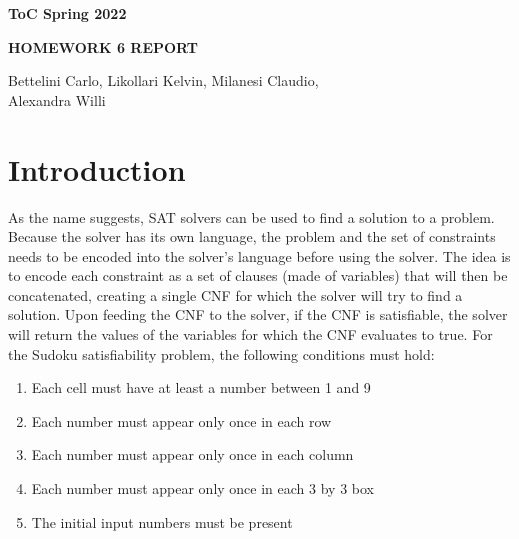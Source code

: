 \documentclass[12pt,a4paper]{article}
\begin{document}
\begin{center}

  \bigskip \bigskip

  {\large \textbf{ToC Spring 2022}}

   \bigskip


   {\large \textbf{HOMEWORK 6 REPORT}}







  \bigskip \bigskip


  {\large Bettelini Carlo, Likollari Kelvin, Milanesi Claudio, \\
  Alexandra Willi
  }

   \bigskip



  \bigskip \bigskip



  \bigskip \bigskip

\end{center}

\section*{Introduction}

As the name suggests, SAT solvers can be used to find a solution to a problem. Because the solver has its own language, the problem and the set of constraints needs to be encoded into the solver's language before using the solver.
The idea is to encode each constraint as a set of clauses (made of variables) that will then be concatenated, creating a single CNF for which the solver will try to find a solution.
Upon feeding the CNF to the solver, if the CNF is satisfiable, the solver will return the values of the variables for which the CNF evaluates to true.
For the Sudoku satisfiability problem, the following conditions must hold:
\begin{enumerate}
  \item Each cell must have at least a number  between 1 and 9
  \item Each number must appear only once in each row
  \item Each number must appear only once in each column
  \item Each number must appear only once in each 3 by 3 box
  \item The initial input numbers must be present
\end{enumerate}
\end{document}
